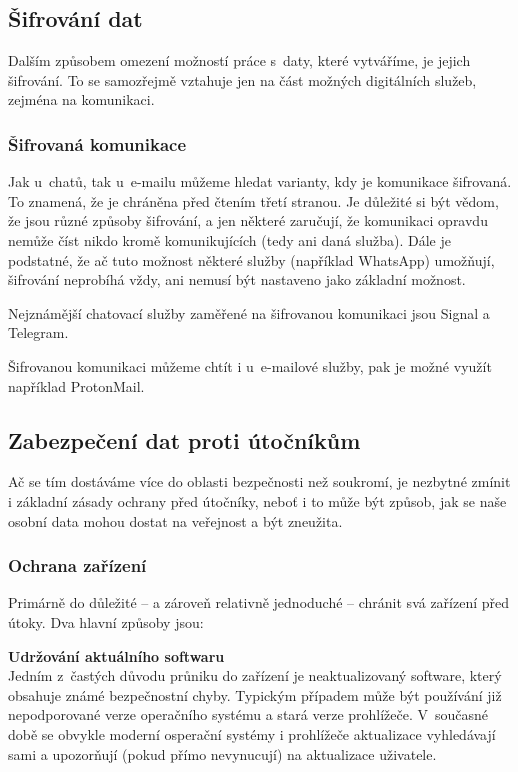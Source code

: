\subsection{Šifrování dat}
Dalším způsobem omezení možností práce s~daty, které vytváříme, je jejich šifrování. To se samozřejmě vztahuje jen na část možných digitálních služeb, zejména na komunikaci.
\subsubsection*{Šifrovaná komunikace}
Jak u~chatů, tak u~e-mailu můžeme hledat varianty, kdy je komunikace šifrovaná. To znamená, že je chráněna před čtením třetí stranou. Je důležité si být vědom, že jsou různé způsoby šifrování, a jen některé zaručují, že komunikaci opravdu nemůže číst nikdo kromě komunikujících (tedy ani daná služba). Dále je podstatné, že ač tuto možnost některé služby (například WhatsApp) umožňují, šifrování neprobíhá vždy, ani nemusí být nastaveno jako základní možnost.

Nejznámější chatovací služby zaměřené na šifrovanou komunikaci jsou Signal a Telegram.

Šifrovanou komunikaci můžeme chtít i u~e-mailové služby, pak je možné využít například ProtonMail. 


\subsection{Zabezpečení dat proti útočníkům}
Ač se tím dostáváme více do oblasti bezpečnosti než soukromí, je nezbytné zmínit i základní zásady ochrany před útočníky, neboť i to může být způsob, jak se naše osobní data mohou dostat na veřejnost a být zneužita.

\subsubsection*{Ochrana zařízení}
Primárně do důležité -- a zároveň relativně jednoduché -- chránit svá zařízení před útoky. Dva hlavní způsoby jsou:

\textbf{Udržování aktuálního softwaru}\\
Jedním z~častých důvodu průniku do zařízení je neaktualizovaný software, který obsahuje známé bezpečnostní chyby. Typickým případem může být používání již nepodporované verze operačního systému a stará verze prohlížeče. V~současné době se obvykle moderní osperační systémy i prohlížeče aktualizace vyhledávají sami a upozorňují (pokud přímo nevynucují) na aktualizace uživatele.


